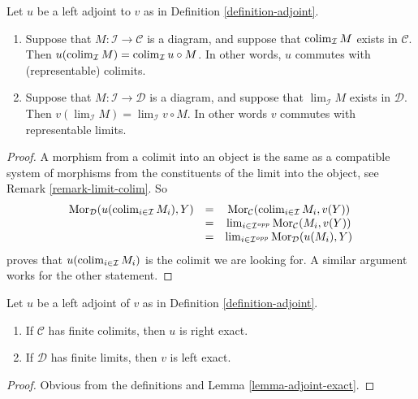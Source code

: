 \begin{lemma}
\label{lemma-adjoint-exact}
Let $u$ be a left adjoint to $v$ as in Definition \ref{definition-adjoint}.
\begin{enumerate}
\item Suppose that $M : \mathcal{I} \to \mathcal{C}$ is a diagram,
and suppose that $\mathop{\mathrm{colim}}\nolimits_\mathcal{I} M$ exists in
$\mathcal{C}$. Then $u(\mathop{\mathrm{colim}}\nolimits_\mathcal{I} M) =
\mathop{\mathrm{colim}}\nolimits_\mathcal{I} u \circ M$. In other words,
$u$ commutes with (representable) colimits.
\item Suppose that $M : \mathcal{I} \to \mathcal{D}$ is a diagram,
and suppose that $\lim_\mathcal{I} M$ exists in
$\mathcal{D}$. Then $v(\lim_\mathcal{I} M) =
\lim_\mathcal{I} v \circ M$. In other words $v$ commutes
with representable limits.
\end{enumerate}
\end{lemma}

\begin{proof}
A morphism from a colimit into an object is the same as a compatible
system of morphisms from the constituents of the limit into the
object, see Remark \ref{remark-limit-colim}. So
$$
\begin{matrix}
\mathop{\mathrm{Mor}}\nolimits_\mathcal{D}(u(\mathop{\mathrm{colim}}\nolimits_{i \in \mathcal{I}} M_i), Y) &
= & \mathop{\mathrm{Mor}}\nolimits_\mathcal{C}(\mathop{\mathrm{colim}}\nolimits_{i \in \mathcal{I}} M_i, v(Y)) \\
& = &
\mathop{\mathrm{lim}}\nolimits_{i \in \mathcal{I}^{opp}}
\mathop{\mathrm{Mor}}\nolimits_\mathcal{C}(M_i, v(Y)) \\
& = &
\mathop{\mathrm{lim}}\nolimits_{i \in \mathcal{I}^{opp}}
\mathop{\mathrm{Mor}}\nolimits_\mathcal{D}(u(M_i), Y)
\end{matrix}
$$
proves that $u(\mathop{\mathrm{colim}}\nolimits_{i \in \mathcal{I}} M_i)$ is
the colimit we are looking for.
A similar argument works for the other statement.
\end{proof}

\begin{lemma}
\label{lemma-exact-adjoint}
Let $u$ be a left adjoint of $v$ as in Definition \ref{definition-adjoint}.
\begin{enumerate}
\item If $\mathcal{C}$ has finite colimits, then $u$ is right exact.
\item If $\mathcal{D}$ has finite limits, then $v$ is left exact.
\end{enumerate}
\end{lemma}

\begin{proof}
Obvious from the definitions and Lemma \ref{lemma-adjoint-exact}.
\end{proof}

